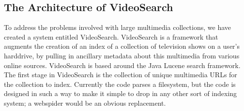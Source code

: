 \documentclass{acm_proc_article-sp}
\begin{document}
\subsection{The Architecture of VideoSearch}
    To address the problems involved with large multimedia collections, we have created a system entitled VideoSearch.  VideoSearch is a framework that augments the creation of an index of a collection of television shows on a user\textquoteright s harddrive, by pulling in ancillary metadata about this multimedia from various online sources.  VideoSearch is based around the Java Lucene search framework.  The first stage in VideoSearch is the collection of unique multimedia URLs for the collection to index. Currently the code parses a filesystem, but the code is designed in such a way to make it simple to drop in any other sort of indexing system; a webspider would be an obvious replacement.  
\end{document}
